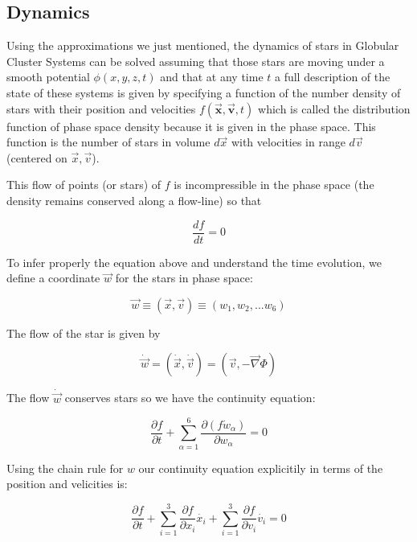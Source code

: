 \subsection{Dynamics}

Using the approximations we just mentioned, the dynamics of stars in Globular Cluster Systems can be solved assuming that those stars are moving under a smooth potential $\phi (x,y,z,t)$ and that at any time $t$ a full description of the state of these systems is given by specifying a function of the number density of stars with their position and velocities $f(\vec{\textbf{x}},\vec{\textbf{v}},t)$ which is called the distribution function of phase space density because it is given in the phase space. This function is the number of stars in volume $d\vec{x}$ with velocities in range $d\vec{v}$ (centered on $\vec{x},\vec{v}$).

This flow of points (or stars) of $f$ is incompressible in the phase space (the density remains conserved along a flow-line) so that

\begin{equation}
\frac{df}{dt}=0
\end{equation}

To infer properly the equation above and understand the time evolution, we define a coordinate $\vec{w}$ for the stars in phase space:

\begin{equation}
\vec{w}\equiv (\vec{x},\vec{v})\equiv (w_{1},w_{2},...w_{6})
\end{equation}

The flow of the star is given by 

\begin{equation}
\dot{\vec{w}}= (\dot{\vec{x}},\dot{\vec{v}})=(\vec{v},-\vec{\nabla} \Phi)
\end{equation}

The flow $\dot{\vec{w}}$ conserves stars so we have the continuity equation:

\begin{equation}
\frac{\partial f}{\partial t}+\sum_{\alpha=1}^{6}\frac{\partial (f\dot{w}_{\alpha})}{\partial w_{\alpha}}=0
\end{equation}

Using the chain rule for $w$ our continuity equation explicitily in terms of the position and velicities is:

\begin{equation}
\frac{\partial f}{\partial t}+\sum_{i=1}^{3}\frac{\partial f}{\partial x_{i}}\dot{x_{i}}+\sum_{i=1}^{3}\frac{\partial f}{\partial v_{i}}\dot{v_{i}}=0
\end{equation}

